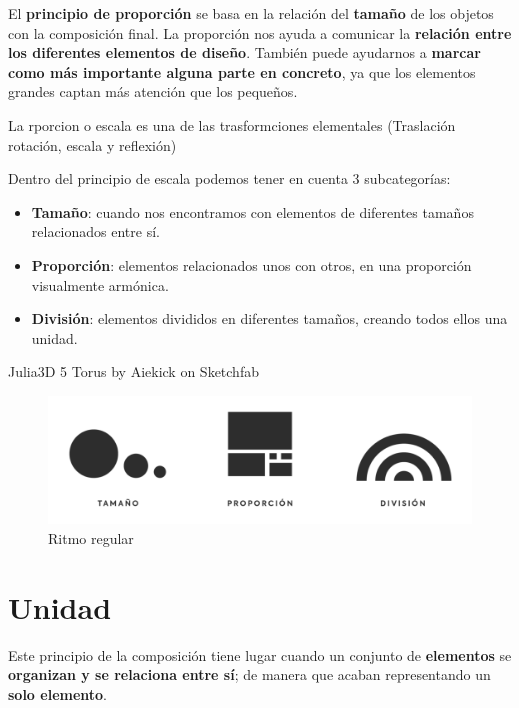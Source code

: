 \documentclass[
  16pt,
]{krantz}
\theoremstyle{definition}
\theoremstyle{definition}
\theoremstyle{definition}
\theoremstyle{definition}
\theoremstyle{remark}
\begin{document}
El \textbf{principio de proporción} se basa en la relación del \textbf{tamaño} de los objetos con la composición final. La proporción nos ayuda a comunicar la \textbf{relación entre los diferentes elementos de diseño}. También puede ayudarnos a \textbf{marcar como más importante alguna parte en concreto}, ya que los elementos grandes captan más atención que los pequeños.

La rporcion o escala es una de las trasformciones elementales (Traslación rotación, escala y reflexión)

Dentro del principio de escala podemos tener en cuenta 3 subcategorías:

\begin{itemize}
\item
  \textbf{Tamaño}: cuando nos encontramos con elementos de diferentes tamaños relacionados entre sí.
\item
  \textbf{Proporción}: elementos relacionados unos con otros, en una proporción visualmente armónica.
\item
  \textbf{División}: elementos divididos en diferentes tamaños, creando todos ellos una unidad.
\end{itemize}

Julia3D 5 Torus by Aiekick on Sketchfab

\begin{figure}

{\centering \includegraphics[width=1\linewidth,height=1\textheight]{proporcion} 

}

\caption{Ritmo regular}\label{fig:proporcion}
\end{figure}

\hypertarget{unidad}{%
\section{Unidad}\label{unidad}}

Este principio de la composición tiene lugar cuando un conjunto de \textbf{elementos} se \textbf{organizan y se relaciona entre sí}; de manera que acaban representando un \textbf{solo elemento}.
\end{document}

